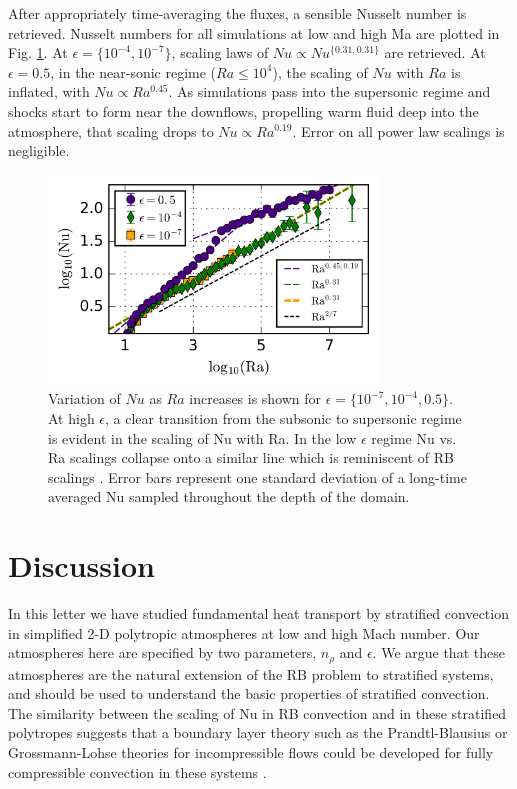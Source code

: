 \documentclass[aps, prl, twocolumn, nofootinbib, groupedaddress, amsfonts, amssymb, amsmath]{revtex4-1}
\newcommand{\nrho}{\ensuremath{n_{\rho}}}
\begin{document}
After appropriately time-averaging the fluxes, a sensible Nusselt number is retrieved.  Nusselt numbers for
all simulations at low and high Ma are plotted in Fig. \ref{fig:nu_v_ra}.  At $\epsilon = \{10^{-4}, 10^{-7}\}$,
scaling laws of $Nu \propto Nu^{\{0.31, 0.31\}}$ are retrieved.  At $\epsilon = 0.5$, in the near-sonic
regime ($Ra \leq 10^4$), the scaling of $Nu$ with $Ra$ is inflated, with $Nu \propto Ra^{0.45}$.  As simulations
pass into the supersonic regime and shocks start to form near the downflows, propelling warm fluid deep
into the atmosphere, that scaling drops to $Nu \propto Ra^{0.19}$.  Error on all power law scalings is
negligible.

\begin{figure}[t]
\includegraphics[width=3.4375in]{./figs/nu_v_ra.png}
\caption{Variation of $Nu$ as $Ra$ increases is shown for $\epsilon = \{10^{-7}, 10^{-4}, 0.5\}$. 
At high $\epsilon$, a clear transition from the subsonic to supersonic regime is evident in the scaling
of Nu with Ra.  In the low $\epsilon$ regime Nu vs. Ra scalings collapse onto a similar line which is
reminiscent of RB scalings \cite{johnston&doering2009}.  Error bars represent one standard deviation
of a long-time averaged Nu sampled throughout the depth of the domain.
\label{fig:nu_v_ra} }
\end{figure}

\section{Discussion}
\label{sec:discussion}
In this letter we have studied fundamental heat transport by stratified convection in simplified 2-D polytropic
atmospheres at low and high Mach number.  Our atmospheres here are specified by two parameters, \nrho 
and $\epsilon$.  We argue that these atmospheres are the natural extension
of the RB problem to stratified systems, and should be used to understand the basic properties of stratified
convection.  The similarity between the scaling of Nu in RB convection and in these stratified polytropes suggests that
a boundary layer theory such as the Prandtl-Blausius or Grossmann-Lohse theories for incompressible flows
could be developed for fully compressible
convection in these systems \cite{ahlers&all2009}.  
\end{document}
